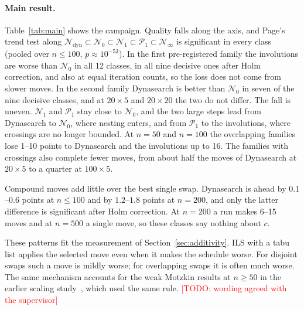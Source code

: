 \documentclass[10pt,twocolumn]{article}
\newcommand{\todo}[1]{\textcolor{red}{[TODO: #1]}}
\newcommand{\N}{\mathcal{N}}
\newcommand{\Pa}{\mathcal{P}}
\begin{document}
\paragraph{Main result.} Table~\ref{tab:main} shows the campaign.
Quality falls along the axis, and Page's trend test along
$\N_{\mathrm{dyn}}\subset\N_0\subset\N_1\subset\Pa_1\subset\N_\infty$
is significant in every class (pooled over $n\leq100$, $p\approx10^{-53}$).
In the first pre-registered family the involutions are worse than
$\N_0$ in all 12 classes, in all nine decisive ones after Holm
correction, and also at equal iteration counts, so the loss does not
come from slower moves. In the second family Dynasearch is better than
$\N_0$ in seven of the nine decisive classes, and at $20\times5$ and
$20\times20$ the two do not differ. The fall is uneven. $\N_1$ and
$\Pa_1$ stay close to $\N_0$, and the two large steps lead from
Dynasearch to $\N_0$, where nesting enters, and from $\Pa_1$ to the
involutions, where crossings are no longer bounded. At $n=50$ and
$n=100$ the overlapping families lose 1--10 points to Dynasearch and
the involutions up to 16. The families with crossings also complete
fewer moves, from about half the moves of Dynasearch at $20\times5$ to a
quarter at $100\times5$.

Compound moves add little over the best single swap. Dynasearch is ahead
by $0.1$--$0.6$ points at $n\leq100$ and by $1.2$--$1.8$ points at
$n=200$, and only the latter difference is significant after Holm
correction. At $n=200$ a run makes 6--15 moves and at $n=500$ a single
move, so these classes say nothing about $c$.

These patterns fit the measurement of Section~\ref{sec:additivity}. ILS
with a tabu list applies the selected move even when it makes the
schedule worse. For disjoint swaps such a move is mildly worse; for
overlapping swaps it is often much worse. The same mechanism accounts
for the weak Motzkin results at $n\geq50$ in the earlier scaling
study~\cite{windowed_own}, which used the same rule.
\todo{wording agreed with the supervisor}
\end{document}
